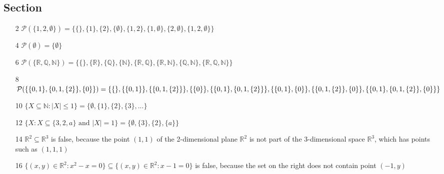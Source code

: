 \documentclass{article}
\begin{document}
\subsection{Section}
\begin{enumerate}
    \item[2] $ \mathcal{P}(\{1,2,\emptyset\}) =\{\{\},\{1\},\{2\},\{\emptyset\},\{1, 2\},\{1, \emptyset\},\{2, \emptyset\},\{1, 2, \emptyset\}\}$
    \item[4] $ \mathcal{P}(\emptyset)=\{\emptyset\}$
    \item[6] $ \mathcal{P}(\{\mathbb{R},\mathbb{Q},\mathbb{N}\}) = \{\{\},\{\mathbb{R}\},\{\mathbb{Q}\},\{\mathbb{N}\},\{\mathbb{R}, \mathbb{Q}\},\{\mathbb{R}, \mathbb{N}\},\{\mathbb{Q}, \mathbb{N}\},\{\mathbb{R}, \mathbb{Q}, \mathbb{N}\}\}$
    \item[8] $ \mathcal{P}(\{\{0,1\},\{0,1,\{2\}\},\{0\}\}) = \{\{\},\{\{0, 1\}\},\{\{0, 1, \{2\}\}\},\{\{0\}\},\\\{\{0, 1\}, \{0, 1, \{2\}\}\},\{\{0, 1\}, \{0\}\},\{\{0, 1, \{2\}\}, \{0\}\},\{\{0, 1\}, \{0, 1, \{2\}\}, \{0\}\}\}$
    \item[10] $\{X \subseteq \mathbb{N}: |X| \leq 1\} = \{\emptyset, \{1\},\{2\},\{3\},...\}$
    \item[12] $\{X: X \subseteq \{3,2,a\} \text{ and } |X|=1 \} = \{\emptyset, \{3\}, \{2\},\{a\}\}$
    \item[14] $ \mathbb{R}^2 \subseteq \mathbb{R}^3$ is false, because the point $(1,1)$ of the 2-dimensional plane $\mathbb{R}^2$ is not part of the 3-dimensional space $\mathbb{R}^3$, which has points such as $(1,1,1)$ 
    \item[16] $ \{(x,y) \in \mathbb{R}^2:x^2-x=0\} \subseteq \{(x,y) \in \mathbb{R}^2:x-1=0\} $ is false, because the set on the right does not contain point $(-1,y)$
\end{enumerate}
\end{document}
